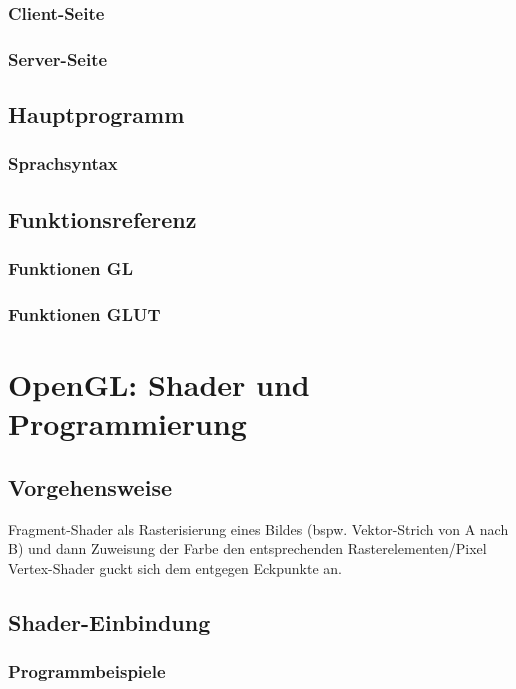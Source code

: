 \subsection{Client-Seite}
\subsection{Server-Seite}

\section{Hauptprogramm}
\subsection{Sprachsyntax}

\section{Funktionsreferenz}
\subsection{Funktionen GL}
\subsection{Funktionen GLUT}

\chapter{OpenGL: Shader und Programmierung}
\section{Vorgehensweise}
Fragment-Shader als Rasterisierung eines Bildes (bspw. Vektor-Strich von A nach B) und dann Zuweisung der Farbe den entsprechenden Rasterelementen/Pixel\\
Vertex-Shader guckt sich dem entgegen Eckpunkte an.
\section{Shader-Einbindung}
\subsection{Programmbeispiele}
